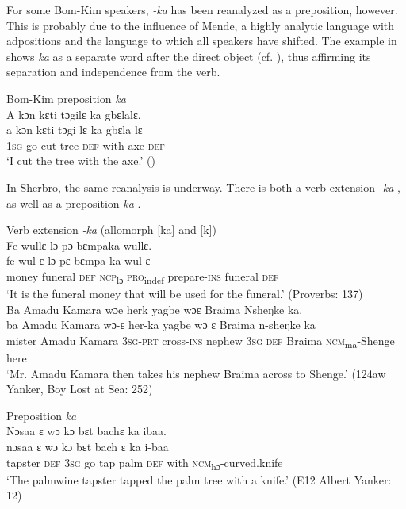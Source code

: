 For some Bom-Kim speakers, \textit{{}-ka} has been reanalyzed as a preposition, however. This is probably due to the influence of Mende, a highly analytic language with adpositions and the language to which all speakers have shifted. The example in  shows \textit{ka} as a separate word after the direct object (cf. ), thus affirming its separation and independence from the verb.

\ea%
    \label{ex:85}
    Bom-Kim preposition \textit{ka}\\
    \vspace{6pt}   
    A kɔn kɛti tɔgilɛ ka gbɛlalɛ.\\
    \gll a     kɔn   kɛti   tɔgi  lɛ    ka    gbɛla    lɛ\\
    1\textsc{sg}  go    cut  tree  \textsc{def}  with  axe    \textsc{def}\\
    \glt ‘I cut the tree with the axe.' (\citealt[445--46]{Childs2020})
\z

In Sherbro, the same reanalysis is underway. There is both a verb extension \textit{{}-ka} , as well as a preposition \textit{ka} .

\newpage
\ea%
\label{ex:86} 
    \ea \label{ex:86a} Verb extension \textit{{}-ka} (allomorph [ka] and [k])\\
    \ea Fe wullɛ lɔ pɔ bɛmpaka wullɛ.\\
    \gll fe      wul    ɛ    lɔ      pɛ      bɛmpa-ka      wul    ɛ\\
    money  funeral  \textsc{def}  \textsc{ncp}\textsubscript{lɔ}    \textsc{pro}\textsubscript{indef}  prepare-\textsc{ins}    funeral  \textsc{def}\\
    \glt ‘It is the funeral money that will be used for the funeral.' (Proverbs: 137)\\
    
	\ex Ba Amadu Kamara wɔe herk yagbe wɔɛ Braima Nsheŋke ka.\\
	\gll ba       Amadu Kamara wɔ-ɛ    her-ka       yagbe  wɔ    ɛ    Braima n-sheŋke      ka\\
	mister  Amadu Kamara \textsc{3sg-prt} cross-\textsc{ins}  nephew  \textsc{3sg}   \textsc{def}  		Braima \textsc{ncm}\textsubscript{ma}{}-Shenge  here\\
	\glt ‘Mr. Amadu Kamara then takes his nephew Braima across to Shenge.' (124aw Yanker, Boy Lost at Sea: 252)\\
 \z

 \ex \label{ex:86b} Preposition \textit{ka}\\
 \ea Nɔsaa ɛ wɔ kɔ bɛt bachɛ ka ibaa.\\
	\gll nɔsaa    ɛ    wɔ    kɔ    bɛt    bach  ɛ    ka    i-baa\\
	tapster  \textsc{def}  \textsc{3sg}  go    tap  palm  \textsc{def}  with  \textsc{ncm}\textsubscript{hɔ}{}-curved.knife\\
	\glt ‘The palmwine tapster tapped the palm tree with a knife.' (E12 Albert Yanker: 12)\\
 
